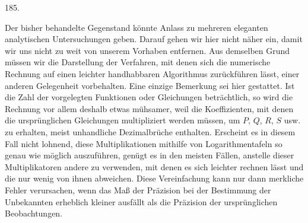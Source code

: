 \begin{center}\hypertarget{native-258-article185}{}185.\end{center}
Der bisher behandelte Gegenstand könnte Anlass zu mehreren eleganten analytischen Untersuchungen geben. Darauf gehen wir hier nicht näher ein, damit wir uns nicht zu weit von unserem Vorhaben entfernen. Aus demselben Grund müssen wir die Darstellung der Verfahren, mit denen sich die numerische Rechnung auf einen leichter handhabbaren Algorithmus zurückführen lässt, einer anderen Gelegenheit vorbehalten. Eine einzige Bemerkung sei hier gestattet. Ist die Zahl der vorgelegten Funktionen oder Gleichungen beträchtlich, so wird die Rechnung vor allem deshalb etwas mühsamer, weil die Koeffizienten, mit denen die ursprünglichen Gleichungen multipliziert werden müssen, um $P$, $Q$, $R$, $S$ usw. zu erhalten, meist unhandliche Dezimalbrüche enthalten. Erscheint es in diesem Fall nicht lohnend, diese Multiplikationen mithilfe von Logarithmentafeln so genau wie möglich auszuführen, genügt es in den meisten Fällen, anstelle dieser Multiplikatoren andere zu verwenden, mit denen es sich leichter rechnen lässt und die nur wenig von ihnen abweichen. Diese Vereinfachung kann nur dann merkliche Fehler verursachen, wenn das Maß der Präzision bei der Bestimmung der Unbekannten erheblich kleiner ausfällt als die Präzision der ursprünglichen Beobachtungen.

